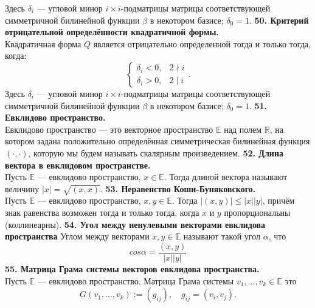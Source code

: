 \documentclass{article}
\begin{document}
Здесь $\delta_i$ --- угловой минор $i\times i$-подматрицы матрицы соответствующей симметричной билинейной функции $\beta$ в некотором базисе; $\delta_0 = 1$.
\newline
\newline
\textbf{50. Критерий отрицательной определённости квадратичной формы.}\\
Квадратичная форма $Q$ является отрицательно определенной тогда и только тогда,\\ когда:
$$
\begin{cases}
	\delta_i < 0, & 2 \nmid i \\
	\delta_i > 0, & 2 \mid i
\end{cases}.
$$
Здесь $\delta_i$ --- угловой минор $i\times i$-подматрицы матрицы соответствующей симметричной билинейной функции $\beta$ в некотором базисе; $\delta_0 = 1$.
\newline
\newline
\textbf{51. Евклидово пространство.}\\
Евклидово пространство --- это векторное пространство $\mathbb{E}$ над полем $\mathbb{R}$, на котором задана положительно определённая симметрическая билинейная функция $(\cdot, \cdot)$, которую мы будем называть скалярным произведением.
\newline
\newline
\textbf{52. Длина вектора в евклидовом пространстве.}\\
Пусть $\mathbb{E}$ --- евклидово пространство, $x\in \mathbb{E}$. Тогда длиной вектора называют величину $|x| = \sqrt{(x,x)}$.
\newline
\newline
\textbf{53. Неравенство Коши-Буняковского.}\\
Пусть $\mathbb{E}$ --- евклидово пространство, $x, y \in \mathbb{E}$. Тогда $|(x,y)| \leqslant |x||y|$, причём знак равенства возможен тогда и только тогда, когда $x$ и $y$ пропорциональны (коллинеарны).
\newline
\newline
\textbf{54. Угол между ненулевыми векторами евклидова пространства}
Углом между векторами $x,y\in \mathbb{E}$ называют такой угол $\alpha$, что 
$$cos\alpha=\frac{(x,y)}{|x||y|}$$
\newline
\newline
\textbf{55. Матрица Грама системы векторов евклидова пространства.}\\
Пусть $\mathbb{E}$ --- евклидово пространство.
Матрица Грама системы $v_1, \ldots, v_k \in \mathbb{E}$ это
	$$G(v_1,\ldots, v_k) := (g_{ij}),\quad g_{ij} = (v_i,v_j).$$
\end{document}
